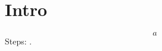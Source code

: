 \documentclass{article}
\newcounter{mine}
\begin{document}
\section{Intro}\label{s:a}
\begin{equation}a\end{equation}
Steps: \themine.
\end{document}
